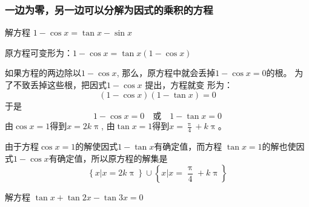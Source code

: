 \subsubsection{一边为零，另一边可以分解为因式的乘积的方程}
\begin{example}
    解方程
$1-\cos x =\tan x-\sin x$
\end{example}

\begin{solution}
    原方程可变形为：$1-\cos x =\tan x(1-\cos x)$

    如果方程的两边除以$1-\cos x$, 那么，原方程中就会丢掉$1-\cos x=0$的根。
为了不致丢掉这些根，把因式$1-\cos x$
提出，方程就变
形为：
\[(1-\cos x)(1-\tan x)=0\]
于是
$$1-\cos x=0\quad  \text{或}\quad 1-\tan x=0$$
由$\cos x=1$得到$x=2k\uppi$, 由$\tan x=1$得到$x=\frac{\uppi}{4}+k\uppi$。

由于方程$\cos x=1$的解使因式$1-\tan x$有确定值，而方程
$\tan x=1$的解也使因式$1-\cos x$有确定值，所以原方程的解集是
\[\left\{x\big|x=2k\uppi\right\}\cup \left\{x\big|x=\frac{\uppi}{4}+k\uppi\right\}\]
\end{solution}


\begin{example}
    解方程 $\tan x+\tan 2x-\tan 3x=0$
\end{example}

